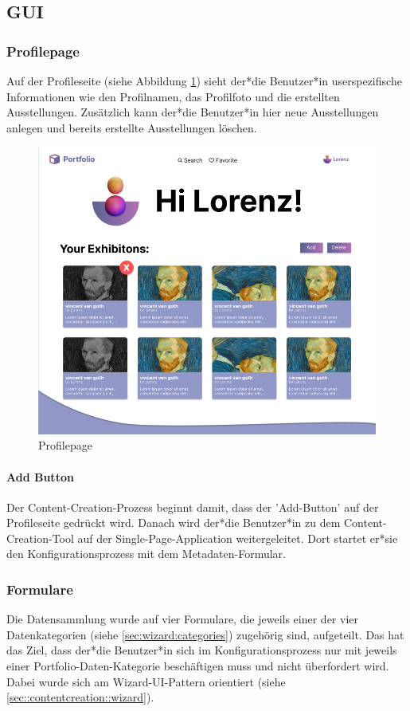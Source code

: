 \subsection{GUI}
\subsubsection{Profilepage}
Auf der Profileseite (siehe Abbildung \ref{fig:impl:sign:profile}) sieht der*die Benutzer*in userspezifische Informationen wie den Profilnamen, das Profilfoto und die erstellten Ausstellungen. Zusätzlich kann der*die Benutzer*in hier neue Ausstellungen anlegen und bereits erstellte Ausstellungen löschen.

\begin{figure}
  \centering
  \includegraphics[scale=0.5]{pics/profilepage.png}
  \caption{Profilepage}
  \label{fig:impl:sign:profile}
\end{figure}

\paragraph*{Add Button}
Der Content-Creation-Prozess beginnt damit, dass der 'Add-Button' auf der Profileseite gedrückt wird. Danach wird der*die Benutzer*in zu dem Content-Creation-Tool auf der Single-Page-Application weitergeleitet. Dort startet er*sie den Konfigurationsprozess mit dem Metadaten-Formular.


\subsubsection{Formulare}
Die Datensammlung wurde auf vier Formulare, die jeweils einer der vier Datenkategorien (siehe \ref{sec:wizard:categories}) zugehörig sind, aufgeteilt. Das hat das Ziel, dass der*die Benutzer*in sich im Konfigurationsprozess nur mit jeweils einer Portfolio-Daten-Kategorie beschäftigen muss und nicht überfordert wird. Dabei wurde sich am Wizard-UI-Pattern orientiert (siehe \ref{sec::contentcreation::wizard}).


